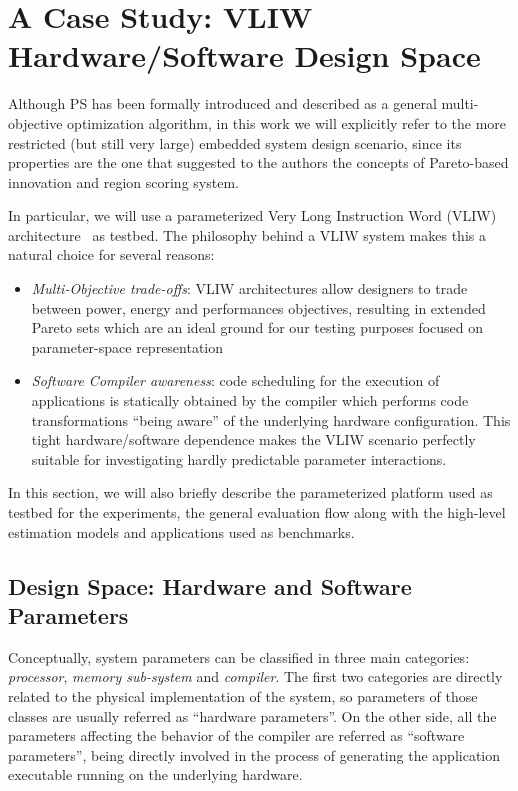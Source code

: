 \section{A Case Study: VLIW Hardware/Software Design Space}
Although PS has been formally introduced and described as a general
multi-objective optimization algorithm, in this work we will
explicitly refer to the more restricted (but still very large)
embedded system design scenario,  since its properties
are the one that suggested to the authors the concepts of Pareto-based
innovation and region scoring system.

In particular, we will use a parameterized Very Long Instruction
Word (VLIW) architecture~\cite{kathail_tr00} as testbed. The philosophy
behind a VLIW system makes this a natural choice for several reasons:
\begin{itemize}
\item \emph{Multi-Objective trade-offs}: VLIW architectures allow designers
to trade between power, energy and performances objectives, resulting
in extended Pareto sets which are an ideal ground for our testing
purposes focused on parameter-space representation
\item \emph{Software Compiler awareness}: code scheduling for the execution of
applications is statically obtained by the compiler which
performs code transformations ``being aware'' of the underlying hardware
configuration.  This tight hardware/software dependence makes the
VLIW scenario perfectly suitable for investigating hardly predictable
parameter interactions.
\end{itemize}

In this section, we will also briefly describe the parameterized platform used
as testbed for the experiments, the general evaluation flow along with
the high-level estimation models and applications used as benchmarks.

\subsection{Design Space: Hardware and Software Parameters}
Conceptually, system parameters can be classified in three main categories:
\emph{processor}, \emph{memory sub-system} and \emph{compiler}. The
first two categories are directly related to the physical
implementation of the system, so parameters of those
classes are usually referred as ``hardware parameters''. On the other
side, all the parameters affecting the behavior of the compiler
are referred as ``software parameters'', being directly involved in
the process of generating the application executable running on the
underlying hardware.

